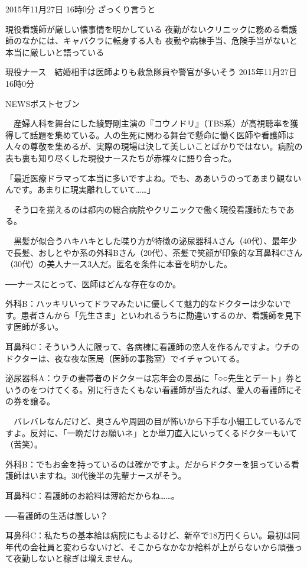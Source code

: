 2015年11月27日 16時0分
ざっくり言うと

    現役看護師が厳しい懐事情を明かしている
    夜勤がないクリニックに務める看護師のなかには、キャバクラに転身する人も
    夜勤や病棟手当、危険手当がないと本当に厳しいと語っている

現役ナース　結婚相手は医師よりも救急隊員や警官が多いそう
2015年11月27日 16時0分

NEWSポストセブン

　産婦人科を舞台にした綾野剛主演の『コウノドリ』（TBS系）が高視聴率を獲得して話題を集めている。人の生死に関わる舞台で懸命に働く医師や看護師は人々の尊敬を集めるが、実際の現場は決して美しいことばかりではない。病院の表も裏も知り尽くした現役ナースたちが赤裸々に語り合った。

「最近医療ドラマって本当に多いですよね。でも、ああいうのってあまり観ないんです。あまりに現実離れしていて……」

　そう口を揃えるのは都内の総合病院やクリニックで働く現役看護師たちである。

　黒髪が似合うハキハキとした喋り方が特徴の泌尿器科Aさん（40代）、最年少で長髪、おしとやか系の外科Bさん（20代）、茶髪で笑顔が印象的な耳鼻科Cさん（30代）の美人ナース3人だ。匿名を条件に本音を明かした。

──ナースにとって、医師はどんな存在なのか。

外科B：ハッキリいってドラマみたいに優しくて魅力的なドクターは少ないです。患者さんから「先生さま」といわれるうちに勘違いするのか、看護師を見下す医師が多い。

耳鼻科C：そういう人に限って、各病棟に看護師の恋人を作るんですよ。ウチのドクターは、夜な夜な医局（医師の事務室）でイチャついてる。

泌尿器科A：ウチの妻帯者のドクターは忘年会の景品に「○○先生とデート」券というのをつけてくる。別に行きたくもない看護師が当たれば、愛人の看護師にその券を譲る。

　バレバレなんだけど、奥さんや周囲の目が怖いから下手な小細工しているんですよ。反対に、「一晩だけお願いネ」とか単刀直入にいってくるドクターもいて（苦笑）。

外科B：でもお金を持っているのは確かですよ。だからドクターを狙っている看護師はいますね。30代後半の先輩ナースがそう。

耳鼻科C：看護師のお給料は薄給だからね……。

──看護師の生活は厳しい？

耳鼻科C：私たちの基本給は病院にもよるけど、新卒で18万円くらい。最初は同年代の会社員と変わらないけど、そこからなかなか給料が上がらないから頑張って夜勤しないと稼ぎは増えません。

